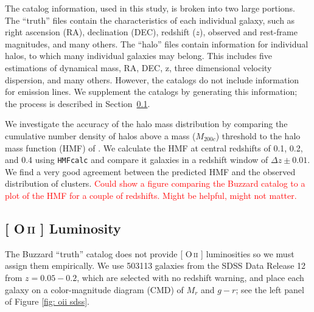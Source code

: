 \documentclass[fleqn,usenatbib]{mnras}
\makeatletter
\newcommand{\editorial}[1]{\textcolor{red}{#1}}
\DeclareRobustCommand{\ion}[2]{%
\relax\ifmmode
\ifx\testbx\f@series
{\mathbf{#1\,\mathsc{#2}}}\else
{\mathrm{#1\,\mathsc{#2}}}\fi
\else\textup{#1\,{\mdseries\textsc{#2}}}%
\fi}
\makeatother
\begin{document}
The catalog information, used in this study, is broken into two large portions. The ``truth'' files contain the characteristics of each individual galaxy, such as right ascension (RA), declination (DEC), redshift ($z$), observed and rest-frame magnitudes, and many others. The ``halo'' files contain information for individual halos, to which many individual galaxies may belong. This includes five estimations of dynamical mass, RA, DEC, z, three dimensional velocity dispersion, and many others. However, the catalogs do not include information for emission lines. We supplement the catalogs by generating this information; the process is described in Section~\ref{sec: oii luminosity}.


We investigate the accuracy of the halo mass distribution by comparing the cumulative number density of halos above a mass ($M_{200c}$) threshold to the halo mass function (HMF) of \cite{Tinker2008}. We calculate the HMF at central redshifts of 0.1, 0.2, and 0.4 using {\tt HMFcalc} \citep{Murray2013} and compare it galaxies in a redshift window of $\Delta z\pm0.01$. We find a very good agreement between the predicted HMF and the observed distribution of clusters. \editorial{Could show a figure comparing the Buzzard catalog to a plot of the HMF for a couple of redshifts. Might be helpful, might not matter.}

\subsection{ {\rm[\ion{O}{ii}]} Luminosity}\label{sec: oii luminosity}
The Buzzard ``truth'' catalog does not provide [\ion{O}{ii}] luminosities so we must assign them empirically. We use 503113 galaxies from the SDSS Data Release 12 \citep{Alam2015} from $z = 0.05 - 0.2$, which are selected with no redshift warning, and place each galaxy on a color-magnitude diagram (CMD) of $M_r$ and $g-r$; see the left panel of Figure \ref{fig: oii sdss}.
\end{document}
